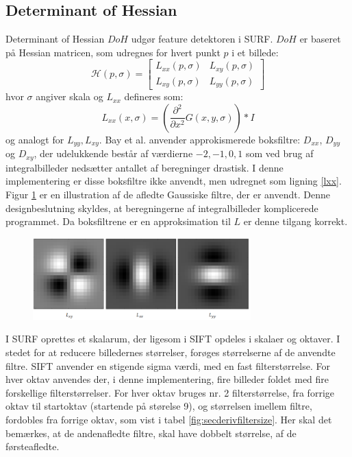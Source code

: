 \subsection{Determinant of Hessian}
Determinant of Hessian $DoH$ udgør feature detektoren i SURF. $DoH$ er baseret på Hessian matricen, som udregnes for hvert punkt $p$ i et billede:
\begin{equation}
\mathcal{H}(p, \sigma) = 
 \begin{bmatrix}
 	L_{xx}(p, \sigma) & L_{xy}(p, \sigma) \\
 	L_{xy}(p, \sigma) & L_{yy}(p, \sigma) 
 \end{bmatrix}
 \label{hessianmatrix}
\end{equation}
hvor $\sigma$ angiver skala og $L_{xx}$ defineres som: 
\begin{equation}
L_{xx}(x, \sigma) = (\frac{\partial^2 }{\partial x^2 } G(x,y,\sigma)) * I
\label{lxx}
\end{equation}
og analogt for $L_{yy}, L_{xy}$. Bay et al. anvender approkismerede boksfiltre: $D_{xx}$, $D_{yy}$ og $D_{xy}$, der udelukkende består af værdierne $-2,-1,0, 1$ som ved brug af integralbilleder nedsætter antallet af beregninger drastisk. I denne implementering er disse boksfiltre ikke anvendt, men udregnet som ligning \eqref{lxx}. Figur \ref{fig:lxxlyylxy} er en illustration af de afledte Gaussiske filtre, der er anvendt. Denne designbeslutning skyldes, at beregningerne af integralbilleder komplicerede programmet. Da 
boksfiltrene er en approksimation til $L$ er denne tilgang korrekt.
\begin{figure}[H]
    \centering
    \includegraphics[width=0.75\textwidth]{fig/31.png}
     \vspace{-0.5em}
    \begin{center}    
       \caption{\textcolor{gray}{\footnotesize \textit{ }}}
    \label{fig:lxxlyylxy}
     \end{center}
     \vspace{-2.5em}
  \end{figure} \noindent
I SURF oprettes et skalarum, der ligesom i SIFT opdeles i skalaer og oktaver. I stedet for at reducere billedernes størrelser, forøges størrelserne af de anvendte filtre. SIFT anvender en stigende sigma værdi, med en fast filterstørrelse. For hver oktav anvendes der, i denne implementering, fire billeder foldet med fire forskellige filterstørrelser. For hver oktav bruges nr. 2 filterstørrelse, fra forrige oktav til startoktav (startende på størelse 9), og størrelsen imellem filtre, fordobles fra forrige oktav, som vist i tabel \ref{fig:secderivfiltersize}. Her skal det bemærkes, at de andenafledte filtre, skal have dobbelt størrelse, af de førsteafledte.
